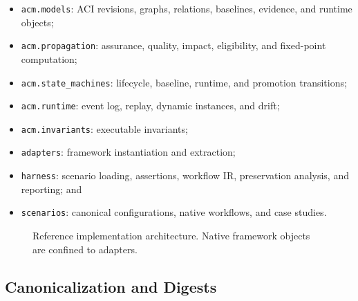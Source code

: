 \documentclass[10pt]{article}
\begin{document}
\begin{itemize}[leftmargin=*]
  \item \texttt{acm.models}: ACI revisions, graphs, relations, baselines, evidence, and runtime objects;
  \item \texttt{acm.propagation}: assurance, quality, impact, eligibility, and fixed-point computation;
  \item \texttt{acm.state\_machines}: lifecycle, baseline, runtime, and promotion transitions;
  \item \texttt{acm.runtime}: event log, replay, dynamic instances, and drift;
  \item \texttt{acm.invariants}: executable invariants;
  \item \texttt{adapters}: framework instantiation and extraction;
  \item \texttt{harness}: scenario loading, assertions, workflow IR, preservation analysis, and reporting; and
  \item \texttt{scenarios}: canonical configurations, native workflows, and case studies.
\end{itemize}

\begin{figure}[t]
\centering
{}
\caption{Reference implementation architecture. Native framework objects are confined to adapters.}
\label{fig:architecture}
\end{figure}

\subsection{Canonicalization and Digests}
\end{document}
